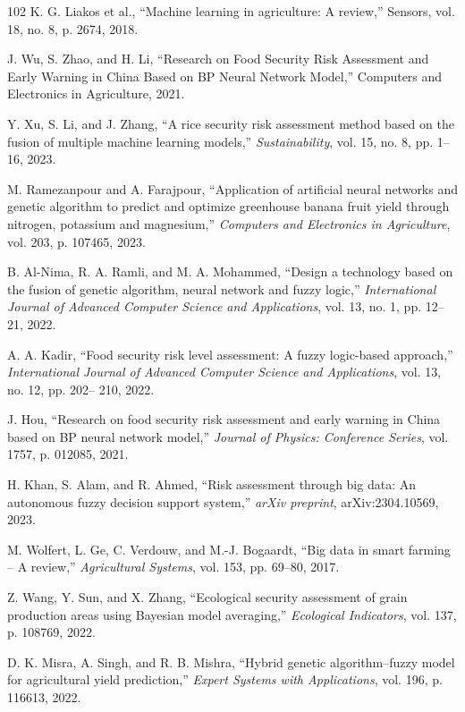 \documentclass[preprint,12pt]{elsarticle}
\begin{document}
\begin{thebibliography}{102}
		K. G. Liakos et al., ``Machine learning in agriculture: A review,'' Sensors, vol. 18, no. 8, p. 2674, 2018.
		
		J. Wu, S. Zhao, and H. Li, ``Research on Food Security Risk Assessment and Early Warning in China Based on BP Neural Network Model,'' Computers and Electronics in Agriculture, 2021.
		
		Y. Xu, S. Li, and J. Zhang, ``A rice security risk assessment method based on the fusion of multiple machine learning models,'' \emph{Sustainability}, vol. 15, no. 8, pp. 1--16, 2023.
		
		M. Ramezanpour and A. Farajpour, ``Application of artificial neural networks and genetic algorithm to predict and optimize greenhouse banana fruit yield through nitrogen, potassium and magnesium,'' \emph{Computers and Electronics in Agriculture}, vol. 203, p. 107465, 2023.
		
		B. Al-Nima, R. A. Ramli, and M. A. Mohammed, ``Design a technology based on the fusion of genetic algorithm, neural network and fuzzy logic,'' \emph{International Journal of Advanced Computer Science and Applications}, vol. 13, no. 1, pp. 12--21, 2022.
		
		A. A. Kadir, ``Food security risk level assessment: A fuzzy logic-based approach,'' \emph{International Journal of Advanced Computer Science and Applications}, vol. 13, no. 12, pp. 202-- 210, 2022.
		
		J. Hou, ``Research on food security risk assessment and early warning in China based on BP neural network model,'' \emph{Journal of Physics: Conference Series}, vol. 1757, p. 012085, 2021.
		
		H. Khan, S. Alam, and R. Ahmed, ``Risk assessment through big data: An autonomous fuzzy decision support system,'' \emph{arXiv preprint}, arXiv:2304.10569, 2023.
		
		M. Wolfert, L. Ge, C. Verdouw, and M.-J. Bogaardt, ``Big data in smart farming -- A review,'' \emph{Agricultural Systems}, vol. 153, pp. 69--80, 2017.
		
		Z. Wang, Y. Sun, and X. Zhang, ``Ecological security assessment of grain production areas using Bayesian model averaging,'' \emph{Ecological Indicators}, vol. 137, p. 108769, 2022.
		
		D. K. Misra, A. Singh, and R. B. Mishra, ``Hybrid genetic algorithm--fuzzy model for agricultural yield prediction,'' \emph{Expert Systems with Applications}, vol. 196, p. 116613, 2022.
		

\end{thebibliography}
\end{document}
